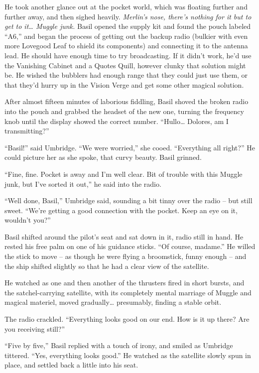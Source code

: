 He took another glance out at the pocket world, which was floating
further and further away, and then sighed heavily. \emph{Merlin's nose,
there's nothing for it but to get to it\ldots{} Muggle junk.} Basil
opened the supply kit and found the pouch labeled ``A6,'' and began the
process of getting out the backup radio (bulkier with even more Lovegood
Leaf to shield its components) and connecting it to the antenna lead. He
should have enough time to try broadcasting. If it didn't work, he'd use
the Vanishing Cabinet and a Quotes Quill, however clunky that solution
might be. He wished the bubblers had enough range that they could just
use them, or that they'd hurry up in the Vision Verge and get some other
magical solution.

After almost fifteen minutes of laborious fiddling, Basil shoved the
broken radio into the pouch and grabbed the headset of the new one,
turning the frequency knob until the display showed the correct number.
``Hullo\ldots{} Dolores, am I transmitting?''

``Basil!'' said Umbridge. ``We were worried,'' she cooed. ``Everything
all right?'' He could picture her as she spoke, that curvy beauty. Basil
grinned.

``Fine, fine. Pocket is away and I'm well clear. Bit of trouble with
this Muggle junk, but I've sorted it out,'' he said into the radio.

``Well done, Basil,'' Umbridge said, sounding a bit tinny over the radio
-- but still sweet. ``We're getting a good connection with the pocket.
Keep an eye on it, wouldn't you?''

Basil shifted around the pilot's seat and sat down in it, radio still in
hand. He rested his free palm on one of his guidance sticks. ``Of
course, madame.'' He willed the stick to move -- as though he were
flying a broomstick, funny enough -- and the ship shifted slightly so
that he had a clear view of the satellite.

He watched as one and then another of the thrusters fired in short
bursts, and the satchel-carrying satellite, with its completely mental
marriage of Muggle and magical materiel, moved gradually\ldots{}
presumably, finding a stable orbit.

The radio crackled. ``Everything looks good on our end. How is it up
there? Are you receiving still?''

``Five by five,'' Basil replied with a touch of irony, and smiled as
Umbridge tittered. ``Yes, everything looks good.'' He watched as the
satellite slowly spun in place, and settled back a little into his seat.

